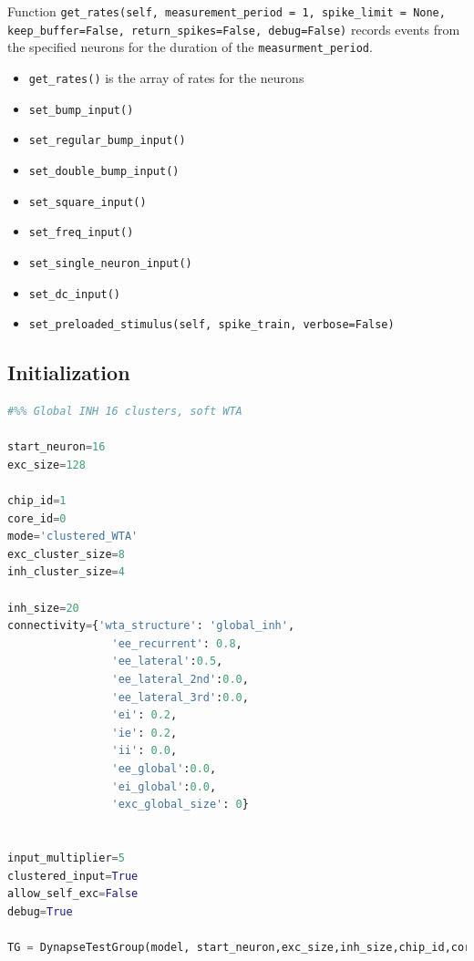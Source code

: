 Function \verb|get_rates(self, measurement_period = 1, spike_limit = None, keep_buffer=False, return_spikes=False, debug=False)| records events from the specified neurons for the duration of the \verb|measurment_period|.

\begin{itemize}
    \item \verb|get_rates()| is the array of rates for the neurons 
    \item \verb|set_bump_input()|
    \item \verb|set_regular_bump_input()|
    \item \verb|set_double_bump_input()|
    \item \verb|set_square_input()|
    \item \verb|set_freq_input()|
    \item \verb|set_single_neuron_input()|
    \item \verb|set_dc_input()|
    \item \verb|set_preloaded_stimulus(self, spike_train, verbose=False)|
\end{itemize}
 
\subsection{Initialization}

\begin{lstlisting}[language=Python, caption=Initialization of the WTA network with a global inhibitory cluster]
#%% Global INH 16 clusters, soft WTA

start_neuron=16
exc_size=128

chip_id=1
core_id=0
mode='clustered_WTA'
exc_cluster_size=8
inh_cluster_size=4

inh_size=20
connectivity={'wta_structure': 'global_inh',
                'ee_recurrent': 0.8,
                'ee_lateral':0.5,
                'ee_lateral_2nd':0.0,
                'ee_lateral_3rd':0.0,
                'ei': 0.2,
                'ie': 0.2,
                'ii': 0.0,
                'ee_global':0.0,
                'ei_global':0.0,
                'exc_global_size': 0}


input_multiplier=5
clustered_input=True
allow_self_exc=False
debug=True

TG = DynapseTestGroup(model, start_neuron,exc_size,inh_size,chip_id,core_id,mode,core_id+1, None, exc_cluster_size,inh_cluster_size,connectivity,input_multiplier,clustered_input,allow_self_exc,debug=debug)

\end{lstlisting}

